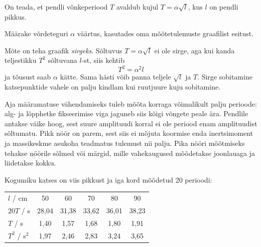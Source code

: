 
On teada, et pendli võnkeperiood $T$ avaldub kujul $T = \alpha\sqrt{l}$, kus
$l$ on pendli pikkus.

Määrake võrdeteguri $\alpha$ väärtus, kasutades oma mõõtetulemuste graafilist
esitust.

\hint

\solu
Mõte on teha graafik \emph{sirgeks}. Sõltuvus $T = \alpha\sqrt{l}$ ei ole
sirge, aga kui kanda teljestikku $T^2$ sõltuvana $l$-st, siis kehtib
\[
T^2 = \alpha^2 l
\]
ja tõusust saab $\alpha$ kätte. Sama hästi võib panna teljele $\sqrt{l}$ ja
$T$. Sirge sobitamine katsepunktide vahele on palju kindlam kui ruutjuure
kuju sobitamine.

Aja määramatuse vähendamiseks tuleb mõõta korraga võimalikult palju
perioode: alg- ja lõpphetke fikseerimise viga jaguneb siis kõigi võngete
peale ära. Pendlile antakse väike hoog, sest suure amplituudi korral ei ole
periood enam amplituudist sõltumatu. Pikk nöör on parem, sest siis ei mõjuta
koormise enda inertsimoment ja massikeskme asukoha teadmatus tulemust nii
palju. Pika nööri mõõtmiseks tehakse nöörile sõlmed või märgid, mille
vahekaugused mõõdetakse joonlauaga ja liidetakse kokku.

Kogumiku katses on viis pikkust ja iga kord mõõdetud 20 perioodi:

\begin{center}
\begin{tabular}{lccccc}
\hline
$l$ / cm & 50 & 60 & 70 & 80 & 90 \\
$20T$ / s & 28,04 & 31,38 & 33,62 & 36,01 & 38,23 \\
$T$ / s & 1,40 & 1,57 & 1,68 & 1,80 & 1,91 \\
$T^2$ / s$^2$ & 1,97 & 2,46 & 2,83 & 3,24 & 3,65 \\
\hline
\end{tabular}
\end{center}

